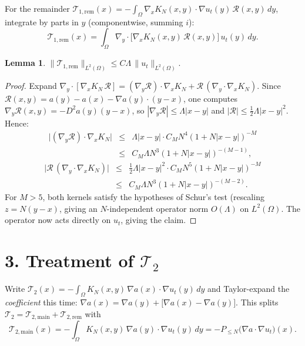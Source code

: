 \documentclass[11pt,letterpaper]{amsart}
\newtheorem{lemma}[theorem]{Lemma}
\newcommand{\Om}{\Omega}
\begin{document}
For the remainder $\mathcal T_{1,\mathrm{rem}}(x) = -\int_\Om \nabla_xK_N(x,y)\cdot\nabla u_t(y)\,\mathcal R(x,y)\,dy$, integrate by parts in $y$ (componentwise, summing $i$):
\[
\mathcal T_{1,\mathrm{rem}}(x) = \int_\Om \nabla_y\cdot\Big[\nabla_xK_N(x,y)\,\mathcal R(x,y)\Big]\,u_t(y)\,dy.
\]
\begin{lemma}\label{lem:T1rem}
$\displaystyle \|\mathcal T_{1,\mathrm{rem}}\|_{L^2(\Om)} \le C\Lambda\,\|u_t\|_{L^2(\Om)}.$
\end{lemma}
\begin{proof}
Expand $\nabla_y\cdot[\nabla_xK_N\,\mathcal R] = (\nabla_y\mathcal R)\cdot\nabla_xK_N + \mathcal R\,(\nabla_y\cdot\nabla_xK_N)$. Since $\mathcal R(x,y)=a(y)-a(x)-\nabla a(y)\cdot(y-x)$, one computes $\nabla_y\mathcal R(x,y) = -D^2a(y)(y-x)$, so $|\nabla_y\mathcal R|\le\Lambda|x-y|$ and $|\mathcal R|\le\tfrac12\Lambda|x-y|^2$. Hence:
\begin{eqnarray*}
\big|(\nabla_y\mathcal R)\cdot\nabla_xK_N\big| &\le& \Lambda|x-y|\cdot C_MN^4(1+N|x-y|)^{-M}\\
 &\le& C_M\Lambda N^3(1+N|x-y|)^{-(M-1)},
 \end{eqnarray*}
 \begin{eqnarray*}
\big|\mathcal R\,(\nabla_y\cdot\nabla_xK_N)\big| &\le& \tfrac12\Lambda|x-y|^2\cdot C_MN^5(1+N|x-y|)^{-M}\\
 &\le& C_M\Lambda N^3(1+N|x-y|)^{-(M-2)}.
\end{eqnarray*}
For $M>5$, both kernels satisfy the hypotheses of Schur's test (rescaling $z=N(y-x)$, giving an $N$-independent operator norm $O(\Lambda)$ on $L^2(\Om)$. The operator now acts directly on $u_t$, giving the claim.
\end{proof}

\section*{3. Treatment of $\mathcal T_2$}

Write $\mathcal T_2(x) = -\int_\Om K_N(x,y)\,\nabla a(x)\cdot\nabla u_t(y)\,dy$ and Taylor-expand the \emph{coefficient} this time: $\nabla a(x) = \nabla a(y) + \big[\nabla a(x)-\nabla a(y)\big]$. This splits $\mathcal T_2 = \mathcal T_{2,\mathrm{main}} + \mathcal T_{2,\mathrm{rem}}$ with
\[
\mathcal T_{2,\mathrm{main}}(x) = -\int_\Om K_N(x,y)\,\nabla a(y)\cdot\nabla u_t(y)\,dy = -P_{\le N}\big(\nabla a\cdot\nabla u_t\big)(x).
\]
\end{document}
